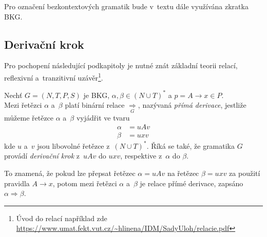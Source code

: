 \begin{convention}
    Pro označení bezkontextových gramatik bude v~textu dále využívána zkratka BKG.
\end{convention}

\subsection*{Derivační krok}\label{kap_der_krok}
Pro pochopení následující podkapitoly je nutné znát základní teorii relací, reflexivní a~tranzitivní uzávěr\footnote{Úvod do relací například zde \href{https://www.umat.fekt.vut.cz/~hlinena/IDM/SadyUloh/relacie.pdf}{https://www.umat.fekt.vut.cz/\textasciitilde hlinena/IDM/SadyUloh/relacie.pdf}}.
\begin{definition}\label{def_derivacni_krok}
    Nechť $G = (N, T, P, S)$ je BKG, $\alpha, \beta  \in (N \cup T)^*$ a $p = A \rightarrow x \in P$. \\
    Mezi řetězci $\alpha$ a~$\beta$ platí binární relace $\underset{G}{\Rightarrow}$, nazývaná \emph{přímá derivace}, jestliže můžeme řetězce $\alpha$ a~$\beta$ vyjádřit ve tvaru
    \begin{align*}
        \alpha &= uAv\\
        \beta &= uxv
    \end{align*}
    kde $u$ a~$v$ jsou libovolné řetězce z~$(N \cup T)^*$. 
    Říká se také, že gramatika $G$ provádí \emph{derivační krok} z~$uAv$ do $uxv$, respektive z~$\alpha$ do $\beta$.
\end{definition}
To znamená, že pokud lze přepsat řetězec $\alpha = uAv$ na řetězec $\beta = uxv$ za použití pravidla $A \rightarrow x$, potom mezi řetězci $\alpha$ a~$\beta$ je relace přímé derivace, zapsáno $\alpha \Rightarrow \beta$.


